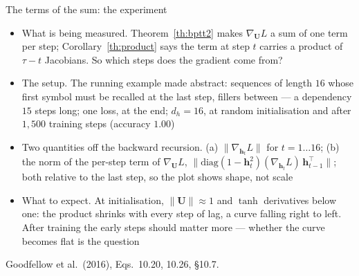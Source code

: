 \documentclass[aspectratio=169, 11pt]{beamer}
\newcommand{\srcline}[1]{%
  \par\vspace{0.25em}%
  {\scriptsize\color{mcMuted}\hfill #1\par}}
\newcommand{\src}[3]{}      %
\begin{document}
\begin{frame}{The terms of the sum: the experiment}
  \src{goodfellow2016}{equation}{10.20}
  \src{goodfellow2016}{equation}{10.26}
  \src{goodfellow2016}{section}{10.7}
  \vspace{-0.15em}
  {\footnotesize
  \begin{itemize}\itemsep0.28em
    \item \alert{What is being measured.} Theorem~\ref{th:bptt2} makes
          $\nabla_{\mathbf{U}}L$ a sum of one term per step;
          Corollary~\ref{th:product} says the term at step $t$ carries a
          product of $\tau - t$ Jacobians. So which steps does the gradient
          come from?
    \item \alert{The setup.} The running example made abstract: sequences
          of length $16$ whose \alert{first} symbol must be recalled at the
          \alert{last} step, fillers between --- a dependency $15$ steps long;
          one loss, at the end; $d_h = 16$, at random initialisation and
          after $1{,}500$ training steps (accuracy $1.00$)
    \item \alert{Two quantities off the backward recursion.} (a)
          $\|\nabla_{\mathbf{h}_t}L\|$ for $t = 1 \ldots 16$; (b) the norm of the
          per-step term of $\nabla_{\mathbf{U}}L$,
          $\|\mathrm{diag}(1 - \mathbf{h}_t^2)(\nabla_{\mathbf{h}_t}L)\,\mathbf{h}_{t-1}^{\top}\|$;
          both relative to the last step, so the plot shows shape, not scale
    \item \alert{What to expect.} At initialisation, $\|\mathbf{U}\| \approx 1$
          and $\tanh$ derivatives below one: the product shrinks with every
          step of lag, a curve falling right to left. After training the
          early steps should matter more --- whether the curve becomes flat
          is the question
  \end{itemize}}
  \srcline{Goodfellow et al.\ (2016), Eqs.~10.20, 10.26, \S10.7.}
\end{frame}
\end{document}
